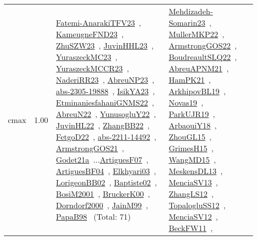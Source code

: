 {\begin{longtable}{p{3cm}r>{\raggedright\arraybackslash}p{6cm}>{\raggedright\arraybackslash}p{6cm}>{\raggedright\arraybackslash}p{8cm}}
\index{cmax}\index{Concepts!cmax}cmax &  1.00 & \href{../works/Fatemi-AnarakiTFV23.pdf}{Fatemi-AnarakiTFV23}~\cite{Fatemi-AnarakiTFV23}, \href{../works/KameugneFND23.pdf}{KameugneFND23}~\cite{KameugneFND23}, \href{../works/ZhuSZW23.pdf}{ZhuSZW23}~\cite{ZhuSZW23}, \href{../works/JuvinHHL23.pdf}{JuvinHHL23}~\cite{JuvinHHL23}, \href{../works/YuraszeckMC23.pdf}{YuraszeckMC23}~\cite{YuraszeckMC23}, \href{../works/YuraszeckMCCR23.pdf}{YuraszeckMCCR23}~\cite{YuraszeckMCCR23}, \href{../works/NaderiRR23.pdf}{NaderiRR23}~\cite{NaderiRR23}, \href{../works/AbreuNP23.pdf}{AbreuNP23}~\cite{AbreuNP23}, \href{../works/abs-2305-19888.pdf}{abs-2305-19888}~\cite{abs-2305-19888}, \href{../works/IsikYA23.pdf}{IsikYA23}~\cite{IsikYA23}, \href{../works/EtminaniesfahaniGNMS22.pdf}{EtminaniesfahaniGNMS22}~\cite{EtminaniesfahaniGNMS22}, \href{../works/AbreuN22.pdf}{AbreuN22}~\cite{AbreuN22}, \href{../works/YunusogluY22.pdf}{YunusogluY22}~\cite{YunusogluY22}, \href{../works/JuvinHL22.pdf}{JuvinHL22}~\cite{JuvinHL22}, \href{../works/ZhangBB22.pdf}{ZhangBB22}~\cite{ZhangBB22}, \href{../works/FetgoD22.pdf}{FetgoD22}~\cite{FetgoD22}, \href{../works/abs-2211-14492.pdf}{abs-2211-14492}~\cite{abs-2211-14492}, \href{../works/ArmstrongGOS21.pdf}{ArmstrongGOS21}~\cite{ArmstrongGOS21}, \href{../works/Godet21a.pdf}{Godet21a}~\cite{Godet21a}...\href{../works/ArtiguesF07.pdf}{ArtiguesF07}~\cite{ArtiguesF07}, \href{../works/ArtiguesBF04.pdf}{ArtiguesBF04}~\cite{ArtiguesBF04}, \href{../works/Elkhyari03.pdf}{Elkhyari03}~\cite{Elkhyari03}, \href{../works/LorigeonBB02.pdf}{LorigeonBB02}~\cite{LorigeonBB02}, \href{../works/Baptiste02.pdf}{Baptiste02}~\cite{Baptiste02}, \href{../works/BosiM2001.pdf}{BosiM2001}~\cite{BosiM2001}, \href{../works/BruckerK00.pdf}{BruckerK00}~\cite{BruckerK00}, \href{../works/Dorndorf2000.pdf}{Dorndorf2000}~\cite{Dorndorf2000}, \href{../works/JainM99.pdf}{JainM99}~\cite{JainM99}, \href{../works/PapaB98.pdf}{PapaB98}~\cite{PapaB98} (Total: 71) & \href{../works/Mehdizadeh-Somarin23.pdf}{Mehdizadeh-Somarin23}~\cite{Mehdizadeh-Somarin23}, \href{../works/MullerMKP22.pdf}{MullerMKP22}~\cite{MullerMKP22}, \href{../works/ArmstrongGOS22.pdf}{ArmstrongGOS22}~\cite{ArmstrongGOS22}, \href{../works/BoudreaultSLQ22.pdf}{BoudreaultSLQ22}~\cite{BoudreaultSLQ22}, \href{../works/AbreuAPNM21.pdf}{AbreuAPNM21}~\cite{AbreuAPNM21}, \href{../works/HamPK21.pdf}{HamPK21}~\cite{HamPK21}, \href{../works/ArkhipovBL19.pdf}{ArkhipovBL19}~\cite{ArkhipovBL19}, \href{../works/Novas19.pdf}{Novas19}~\cite{Novas19}, \href{../works/ParkUJR19.pdf}{ParkUJR19}~\cite{ParkUJR19}, \href{../works/ArbaouiY18.pdf}{ArbaouiY18}~\cite{ArbaouiY18}, \href{../works/ZhouGL15.pdf}{ZhouGL15}~\cite{ZhouGL15}, \href{../works/GrimesH15.pdf}{GrimesH15}~\cite{GrimesH15}, \href{../works/WangMD15.pdf}{WangMD15}~\cite{WangMD15}, \href{../works/MeskensDL13.pdf}{MeskensDL13}~\cite{MeskensDL13}, \href{../works/MenciaSV13.pdf}{MenciaSV13}~\cite{MenciaSV13}, \href{../works/ZhangLS12.pdf}{ZhangLS12}~\cite{ZhangLS12}, \href{../works/TopalogluSS12.pdf}{TopalogluSS12}~\cite{TopalogluSS12}, \href{../works/MenciaSV12.pdf}{MenciaSV12}~\cite{MenciaSV12}, \href{../works/BeckFW11.pdf}{BeckFW11}~\cite{BeckFW11}, 
\end{longtable}}
